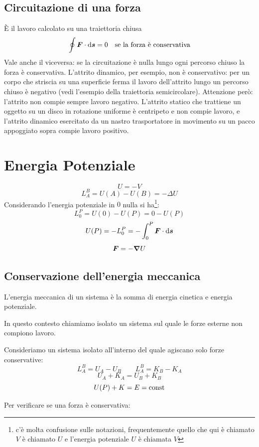 \subsection{Circuitazione di una forza}
\`E il lavoro calcolato su una traiettoria chiusa
\[\oint \boldsymbol{F}\cdot\mathrm{d} \boldsymbol{s}=0 \quad \text{se la forza è conservativa}\]
Vale anche il viceversa: se la circuitazione è nulla lungo ogni percorso chiuso la forza è conservativa. L'attrito dinamico, per esempio, non è conservativo: per un corpo che striscia su una superficie ferma il lavoro dell'attrito lungo un percorso chiuso è negativo (vedi l'esempio della traiettoria semicircolare). Attenzione però: l'attrito non compie sempre lavoro negativo. L'attrito statico che trattiene un oggetto su un disco in rotazione uniforme è centripeto e non compie lavoro, e l'attrito dinamico esercitato da un nastro trasportatore in movimento su un pacco appoggiato sopra compie lavoro positivo.

\section{Energia Potenziale}
\[U=-V\]
\[L_A^B=U(A)-U(B)=-\Delta U\]
Considerando l'energia potenziale in $0$ nulla si ha\footnote{c'è molta confusione sulle notazioni, frequentemente quello che qui è chiamato $V$ è chiamato $U$ e l'energia potenziale $U$ è chiamata $V$}:
\[L_0^P=U(0)-U(P)=0-U(P)\]
\[U(P)=-L_0^P=-\int_0^P \boldsymbol{F}\cdot\mathrm{d} \boldsymbol{s}\]
\[\boldsymbol{F}=-\boldsymbol{\nabla} U\]

\subsection{Conservazione dell'energia meccanica}
\begin{Def}
  L'energia meccanica di un sistema è la somma di energia cinetica e energia potenziale.
\end{Def}
\begin{Def}
  In questo contesto chiamiamo isolato un sistema sul quale le forze esterne non compiono lavoro.
\end{Def}

\begin{Teo}
  Consideriamo un sistema isolato all'interno del quale agiscano solo forze conservative:
  \[L_A^B=U_A-U_B\qquad L_A^B=K_B-K_A\]
  \[U_A+K_A=U_B+K_B\]
  \[U(P)+K=E=\text{const}\]
\end{Teo}
Per verificare se una forza è conservativa:

